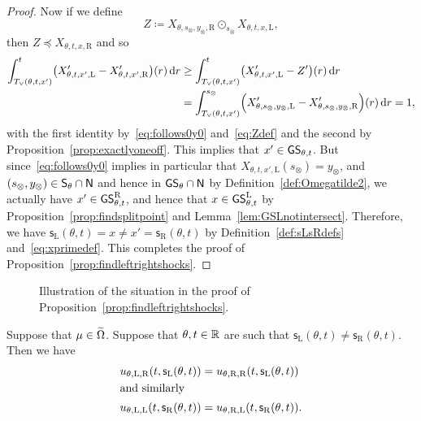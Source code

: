 \documentclass[AHL,Unicode,longabstracts]{cedram}
\newcommand*\ssS{\mathsf{S}}
\newcommand*\GS{\mathsf{GS}}
\newcommand*\ssN{\mathsf{N}}
\newcommand*\sfs{\mathsf{s}}
\newcommand*\RR{\mathbb{R}}
\newcommand*\dif{\mathrm{d}}
\newcommand*\Left{\mathrm{L}}
\newcommand*\Right{\mathrm{R}}
\let\oldin\in
\renewcommand{\in}{\mathchoice{\oldin}{\oldin}{\,\oldin\,}{\,\oldin\,}}
\let\oldcap\cap
\renewcommand{\cap}{\mathchoice{\oldcap}{\oldcap}{\,\oldcap\,}{\,\oldcap\,}}
\let\originalleft\left
\let\originalright\right
\renewcommand{\left}{\mathopen{}\mathclose\bgroup\originalleft}
\renewcommand{\right}{\aftergroup\egroup\originalright}
\newcommand*\RR{\mathbb{R}}
\begin{document}
\begin{proof}
Now if we define
\begin{equation}\label{eq:Zdef}
Z\coloneqq X_{\theta,s_{\otimes},y_{\otimes},\Right}\odot_{s_{\otimes}}X_{\theta,t,x,\Left},
\end{equation}
then $Z\preccurlyeq X_{\theta,t,x,\Right}$ and so
\begin{align*}
\int_{T_{\vee}(\theta,t,x')}^{t}\left(X_{\theta,t,x',\Left}'-X_{\theta,t,x',\Right}'\right)(r)\,\dif r & \ge\int_{T_{\vee}(\theta,t,x')}^{t}\left(X_{\theta,t,x',\Left}'-Z'\right)(r)\,\dif r\\
& =\int_{T_{\vee}(\theta,t,x')}^{s_{\otimes}}\left(X_{\theta,s_{\otimes},y_{\otimes},\Left}'-X_{\theta,s_{\otimes},y_{\otimes},\Right}'\right)(r)\,\dif r=1,
\end{align*}
with the first identity by~\eqref{eq:follows0y0} and~\eqref{eq:Zdef} and the second by Proposition~\ref{prop:exactlyoneoff}. This implies that $x'\in\GS_{\theta,t}$. But since~\eqref{eq:follows0y0} implies in particular that $X_{\theta,t,x',\Left}(s_{\otimes})=y_{\otimes}$, and $(s_{\otimes},y_{\otimes})\in\ssS_{\theta}\cap\ssN$ and hence in $\GS_{\theta}\cap\ssN$ by Definition~\ref{def:Omegatilde2}, we actually have $x'\in\GS_{\theta,t}^{\Right}$, and hence that $x\in\GS_{\theta,t}^{\Left}$ by Proposition~\ref{prop:findsplitpoint} and Lemma~\ref{lem:GSLnotintersect}. Therefore, we have $\sfs_{\Left}(\theta,t)=x\ne x'=\sfs_{\Right}(\theta,t)$ by Definition~\ref{def:sLsRdefs} and~\eqref{eq:xprimedef}. This completes the proof of Proposition~\ref{prop:findleftrightshocks}.
\end{proof}


\begin{figure}[!hbp]
\begin{centering}

\end{centering}
\caption[Illustration of the situation in the proof of Proposition~\ref{prop:findleftrightshocks}]{Illustration of the situation in the proof of Proposition~\ref{prop:findleftrightshocks}.}
\label{fig:global_shock_minimizers_picture}
\end{figure}


\begin{prop}\label{prop:converse}
Suppose that $\mu\in\widetilde{\Omega}$. Suppose that $\theta,t\in\RR$ are such that $\sfs_{\Left}(\theta,t)\ne\sfs_{\Right}(\theta,t)$. Then we have
\begin{align*}
u_{\theta,\Left,\Right}(t,\sfs_{\Left}(\theta,t)) &=u_{\theta,\Right,\Right}(t,\sfs_{\Left}(\theta,t))
\\[-0.2em]
\intertext{and similarly}
u_{\theta,\Left,\Left}(t,\sfs_{\Right}(\theta,t)) &=u_{\theta,\Right,\Left}(t,\sfs_{\Right}(\theta,t)).
\end{align*}
\end{prop}
\end{document}
